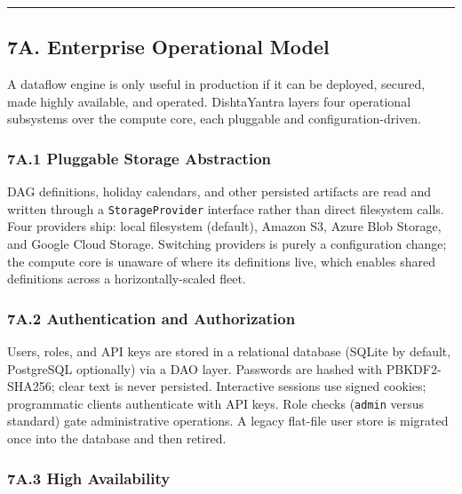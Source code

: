 \documentclass[
]{article}
\begin{document}
\begin{center}\rule{0.5\linewidth}{0.5pt}\end{center}

\hypertarget{a.-enterprise-operational-model}{%
\subsection{7A. Enterprise Operational
Model}\label{a.-enterprise-operational-model}}

A dataflow engine is only useful in production if it can be deployed,
secured, made highly available, and operated. DishtaYantra layers four
operational subsystems over the compute core, each pluggable and
configuration-driven.

\hypertarget{a.1-pluggable-storage-abstraction}{%
\subsubsection{7A.1 Pluggable Storage
Abstraction}\label{a.1-pluggable-storage-abstraction}}

DAG definitions, holiday calendars, and other persisted artifacts are
read and written through a \texttt{StorageProvider} interface rather
than direct filesystem calls. Four providers ship: local filesystem
(default), Amazon S3, Azure Blob Storage, and Google Cloud Storage.
Switching providers is purely a configuration change; the compute core
is unaware of where its definitions live, which enables shared
definitions across a horizontally-scaled fleet.

\hypertarget{a.2-authentication-and-authorization}{%
\subsubsection{7A.2 Authentication and
Authorization}\label{a.2-authentication-and-authorization}}

Users, roles, and API keys are stored in a relational database (SQLite
by default, PostgreSQL optionally) via a DAO layer. Passwords are hashed
with PBKDF2-SHA256; clear text is never persisted. Interactive sessions
use signed cookies; programmatic clients authenticate with API keys.
Role checks (\texttt{admin} versus standard) gate administrative
operations. A legacy flat-file user store is migrated once into the
database and then retired.

\hypertarget{a.3-high-availability}{%
\subsubsection{7A.3 High Availability}\label{a.3-high-availability}}
\end{document}
